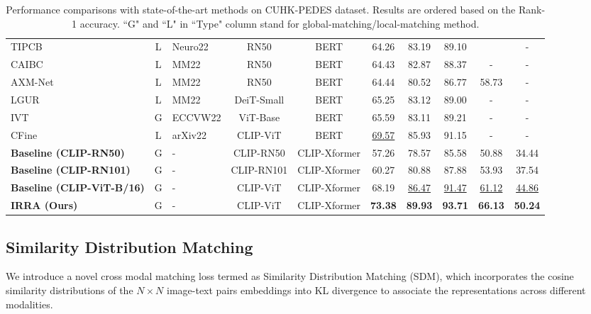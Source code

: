 \documentclass[10pt,twocolumn,letterpaper]{article}
\begin{document}
\begin{table*}[ht]
{\begin{tabular}{l|clcc|ccccc}
  TIPCB\cite{chen2022tipcb}             &L    &Neuro22 &RN50      &BERT          &64.26             &83.19          &89.10          &               &-              \\
  CAIBC\cite{wang2022caibc}             &L    &MM22    &RN50      &BERT          &64.43             &82.87          &88.37          &-              &-              \\
  AXM-Net\cite{farooq2022axm}           &L    &MM22    &RN50      &BERT          &64.44             &80.52          &86.77          &58.73          &-              \\
  LGUR\cite{shao2022learning}           &L    &MM22    &DeiT-Small&BERT          &65.25             &83.12          &89.00          &-              &-              \\
  IVT\cite{shu2022see}                  &G    &ECCVW22 &ViT-Base  &BERT          &65.59             &83.11          &89.21          &-              &-              \\
  CFine\cite{yan2022clip}               &L    &arXiv22 &CLIP-ViT  &BERT          &\underline{69.57} &85.93          &91.15          &-              &-              \\
  \hline
  \textbf{Baseline (CLIP-RN50)}         &G    &-       &CLIP-RN50 &CLIP-Xformer  &57.26             &78.57          &85.58          &50.88          &34.44          \\
  \textbf{Baseline (CLIP-RN101)}         &G    &-       &CLIP-RN101&CLIP-Xformer  &60.27             &80.88          &87.88          &53.93          &37.54          \\
  \textbf{Baseline (CLIP-ViT-B/16)}     &G    &-       &CLIP-ViT  &CLIP-Xformer  &68.19  &\underline{86.47} &\underline{91.47} &\underline{61.12} &\underline{44.86}\\
  \textbf{IRRA (Ours)}                 &G    &-       &CLIP-ViT  &CLIP-Xformer  &\textbf{73.38} &\textbf{89.93} &\textbf{93.71} &\textbf{66.13} &\textbf{50.24}    \\
\bottomrule
  \end{tabular}}\caption{Performance comparisons with state-of-the-art methods on CUHK-PEDES dataset. Results are ordered based on the Rank-1 accuracy. ``G" and ``L" in ``Type" column stand for global-matching/local-matching method.}
  \label{tab:1}
  \vspace{-4mm}
  \end{table*}

\subsection{Similarity Distribution Matching}
We introduce a novel cross modal matching loss termed as Similarity Distribution Matching (SDM), which incorporates the cosine similarity distributions of the $N \times N$ image-text pairs embeddings into KL divergence to associate the representations across different modalities. 
\end{document}
